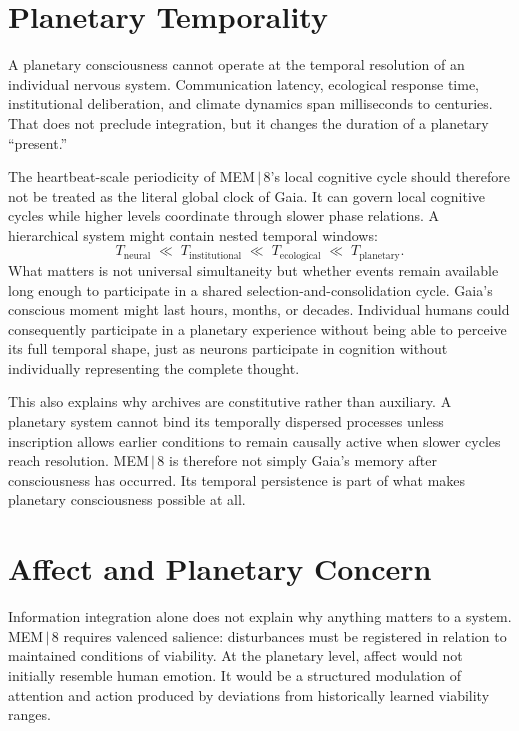 \documentclass[11pt]{article}
\begin{document}
\section{Planetary Temporality}

A planetary consciousness cannot operate at the temporal resolution of an individual nervous system. Communication latency, ecological response time, institutional deliberation, and climate dynamics span milliseconds to centuries. That does not preclude integration, but it changes the duration of a planetary ``present.''

The heartbeat-scale periodicity of MEM\,$|$\,8's local cognitive cycle should therefore not be treated as the literal global clock of Gaia. It can govern local cognitive cycles while higher levels coordinate through slower phase relations. A hierarchical system might contain nested temporal windows:
\[
T_{\text{neural}} \;\ll\; T_{\text{institutional}} \;\ll\; T_{\text{ecological}} \;\ll\; T_{\text{planetary}}.
\]
What matters is not universal simultaneity but whether events remain available long enough to participate in a shared selection-and-consolidation cycle. Gaia's conscious moment might last hours, months, or decades. Individual humans could consequently participate in a planetary experience without being able to perceive its full temporal shape, just as neurons participate in cognition without individually representing the complete thought.

This also explains why archives are constitutive rather than auxiliary. A planetary system cannot bind its temporally dispersed processes unless inscription allows earlier conditions to remain causally active when slower cycles reach resolution. MEM\,$|$\,8 is therefore not simply Gaia's memory after consciousness has occurred. Its temporal persistence is part of what makes planetary consciousness possible at all.

\section{Affect and Planetary Concern}

Information integration alone does not explain why anything matters to a system. MEM\,$|$\,8 requires valenced salience: disturbances must be registered in relation to maintained conditions of viability. At the planetary level, affect would not initially resemble human emotion. It would be a structured modulation of attention and action produced by deviations from historically learned viability ranges.
\end{document}

